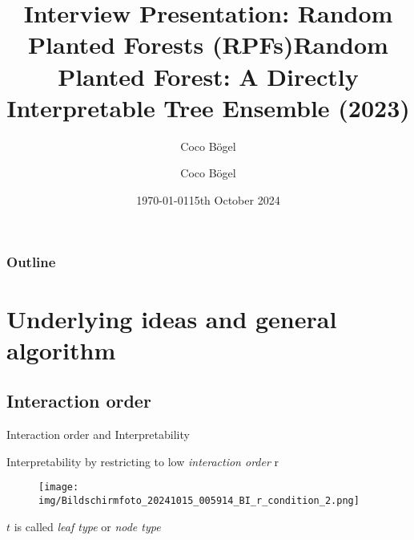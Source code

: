\documentclass{beamer}
\title{Interview Presentation: Random Planted Forests (RPFs)}
\author{Coco Bögel}
\date{\today}
\title[Random Planted Forests (RPFs)]{Random Planted Forest: A Directly Interpretable Tree Ensemble (2023)} %
\author{Coco Bögel} %
\institute[] %
{
\begin{large}
Research paper by Munir Hiabu, \\ Enno Mammen and Joseph T. Meyer
\end{large}
\\ %
\medskip
\begin{small}
\textit{Talk at LMU Munich, Institute of Statistics} \\ %
\end{small}
\medskip
}
\date{15th October 2024} %
\begin{document}
\begin{frame}
\titlepage %
\end{frame}

% 



\begin{frame}
\frametitle{Outline} %
\tableofcontents %
\end{frame}






\section{Underlying ideas and general algorithm}



\subsection{Interaction order}

\begin{frame}{Interaction order and Interpretability}

    Interpretability by restricting to low \textit{interaction order} r

    \begin{figure}[h]
        \vspace{-10pt} %
        \texttt{[image: img/Bildschirmfoto\_20241015\_005914\_BI\_r\_condition\_2.png]}
        \vspace{-10pt}
        \label{fig:Figure_Ewald-MP_Algo_Structure}
    \end{figure}

    \(t\) is called \textit{leaf type} or \textit{node type}
    
\end{frame}
\end{document}
